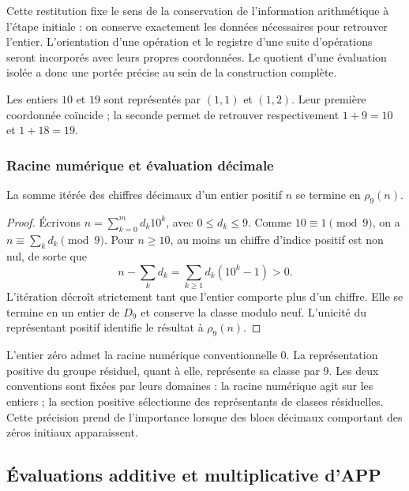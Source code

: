 Cette restitution fixe le sens de la conservation de l'information arithmétique à l'étape initiale : on conserve exactement les données nécessaires pour retrouver l'entier. L'orientation d'une opération et le registre d'une suite d'opérations seront incorporés avec leurs propres coordonnées. Le quotient d'une évaluation isolée a donc une portée précise au sein de la construction complète.

\begin{ejemplo}
Les entiers $10$ et $19$ sont représentés par $(1,1)$ et $(1,2)$. Leur première coordonnée coïncide ; la seconde permet de retrouver respectivement $1+9=10$ et $1+18=19$.
\end{ejemplo}

\subsubsection{Racine numérique et évaluation décimale}

\begin{bloqueindivisible}
\begin{proposicion}
\label{prop:app-raiz-digital}
La somme itérée des chiffres décimaux d'un entier positif $n$ se termine en $\rho_9(n)$.
\end{proposicion}

\begin{proof}
Écrivons $n=\sum_{k=0}^{m}d_k10^k$, avec $0\leq d_k\leq9$. Comme $10\equiv1\pmod9$, on a $n\equiv\sum_kd_k\pmod9$. Pour $n\geq10$, au moins un chiffre d'indice positif est non nul, de sorte que
\[
 n-\sum_kd_k=\sum_{k\geq1}d_k(10^k-1)>0.
\]
L'itération décroît strictement tant que l'entier comporte plus d'un chiffre. Elle se termine en un entier de $D_9$ et conserve la classe modulo neuf. L'unicité du représentant positif identifie le résultat à $\rho_9(n)$.
\end{proof}
\end{bloqueindivisible}

L'entier zéro admet la racine numérique conventionnelle $0$. La représentation positive du groupe résiduel, quant à elle, représente sa classe par $9$. Les deux conventions sont fixées par leurs domaines : la racine numérique agit sur les entiers ; la section positive sélectionne des représentants de classes résiduelles. Cette précision prend de l'importance lorsque des blocs décimaux comportant des zéros initiaux apparaissent.

\subsection{Évaluations additive et multiplicative d'APP}
\label{sec:app-evaluaciones}

